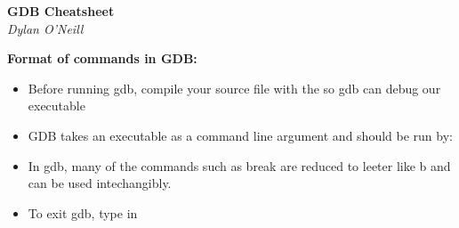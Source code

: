 \documentclass{article}
\begin{document}
\begin{center}
\LARGE\textbf{GDB Cheatsheet}\\
\textit{Dylan O'Neill}
\end{center}

\begin{framed}
\begin{center}
\Large\textbf{Format of commands in GDB: }
\end{center}
\begin{itemize}
\item Before running gdb, compile your source file with the   so gdb can debug our executable
\item GDB takes an executable as a command line argument and should be run by:  
\item In gdb, many of the commands such as break are reduced to leeter like b and can be used intechangibly.
\item To exit gdb, type in    \\
\end{itemize}
\end{framed}
\end{document}
